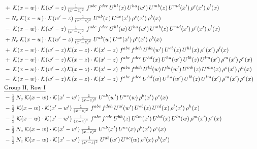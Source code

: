 \documentclass[10pt]{article}
\numberwithin{equation}{section}
\begin{document}
\begin{align}
&\quad +\;\mathcal{K}(x-w)\cdot\mathcal{K}(w'-z)\,\tfrac{1}{(x'-z)^{2}}\;f^{abc}\,f^{dce}\,U^{hl}(x)\,U^{ha}(w')\,U^{mb}(z)\,U^{md}(x')\,\rho^{e}(x')\,\rho^{l}(x)\notag\\
&\quad -N_c\;\mathcal{K}(x-w)\cdot\mathcal{K}(w'-z)\,\tfrac{1}{(x'-z)^{2}}\;U^{ab}(x)\,U^{ac}(x')\,\rho^{c}(x')\,\rho^{b}(x)\notag\\
&\quad -\;\mathcal{K}(x-w)\cdot\mathcal{K}(w'-z)\,\tfrac{1}{(x'-z)^{2}}\;f^{abc}\,f^{dce}\,U^{hl}(w)\,U^{ha}(w')\,U^{mb}(z)\,U^{md}(x')\,\rho^{e}(x')\,\rho^{l}(x)\notag\\
&\quad +N_c\;\mathcal{K}(x-w)\cdot\mathcal{K}(w'-z)\,\tfrac{1}{(x'-z)^{2}}\;U^{ab}(w)\,U^{ac}(x')\,\rho^{c}(x')\,\rho^{b}(x)\notag\\
&\quad +\;\mathcal{K}(x-w)\cdot\mathcal{K}(w'-z)\,\mathcal{K}(x-z)\cdot\mathcal{K}(x'-z)\;f^{abc}\,f^{deh}\,U^{da}(w')\,U^{eb}(z)\,U^{hl}(x)\,\rho^{c}(x')\,\rho^{l}(x)\notag\\
&\quad +\;\mathcal{K}(x-w)\cdot\mathcal{K}(w'-z)\,\mathcal{K}(x-z)\cdot\mathcal{K}(x'-z)\;f^{abc}\,f^{dce}\,U^{hd}(x)\,U^{ha}(w')\,U^{lb}(z)\,U^{lm}(x')\,\rho^{m}(x')\,\rho^{e}(x)\notag\\
&\quad -\;\mathcal{K}(x-w)\cdot\mathcal{K}(w'-z)\,\mathcal{K}(x-z)\cdot\mathcal{K}(x'-z)\;f^{abc}\,f^{deh}\,U^{ld}(w)\,U^{la}(w')\,U^{mb}(z)\,U^{me}(x)\,\rho^{c}(x')\,\rho^{h}(x)\notag\\
&\quad -\;\mathcal{K}(x-w)\cdot\mathcal{K}(w'-z)\,\mathcal{K}(x-z)\cdot\mathcal{K}(x'-z)\;f^{abc}\,f^{dce}\,U^{hd}(w)\,U^{ha}(w')\,U^{lb}(z)\,U^{lm}(x')\,\rho^{m}(x')\,\rho^{e}(x)\notag\\
&\quad\underline{\text{Group II, Row I}}\notag\\
&\quad -\tfrac{1}{2}\,N_c\;\mathcal{K}(x-w)\cdot\mathcal{K}(x'-w')\,\tfrac{1}{(x-z)^{2}}\;U^{ab}(w')\,U^{ac}(w)\,\rho^{b}(x')\,\rho^{c}(x)\notag\\
&\quad -\tfrac{1}{2}\;\mathcal{K}(x-w)\cdot\mathcal{K}(x'-w')\,\tfrac{1}{(x-z)^{2}}\;f^{abc}\,f^{deh}\,U^{al}(w')\,U^{eb}(z)\,U^{cd}(x)\,\rho^{l}(x')\,\rho^{h}(x)\notag\\
&\quad -\tfrac{1}{2}\;\mathcal{K}(x-w)\cdot\mathcal{K}(x'-w')\,\tfrac{1}{(x-z)^{2}}\;f^{abc}\,f^{cde}\,U^{bh}(z)\,U^{lm}(x')\,U^{hd}(x)\,U^{la}(w)\,\rho^{m}(x')\,\rho^{e}(x)\notag\\
&\quad -\tfrac{1}{2}\,N_c\;\mathcal{K}(x-w)\cdot\mathcal{K}(x'-w')\,\tfrac{1}{(x-z)^{2}}\;U^{ab}(x')\,U^{ac}(x)\,\rho^{b}(x')\,\rho^{c}(x)\notag\\
&\quad -\tfrac{1}{2}\,N_c\;\mathcal{K}(x-w)\cdot\mathcal{K}(x'-w')\,\tfrac{1}{(x'-z)^{2}}\;U^{ab}(w')\,U^{ac}(w)\,\rho^{c}(x)\,\rho^{b}(x')\notag\\

\end{align}
\end{document}
